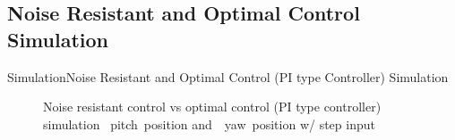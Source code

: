 \documentclass{beamer}
\begin{document}
\subsection{Noise Resistant and Optimal Control Simulation}
\begin{frame}{Simulation}{Noise Resistant and Optimal Control (PI type Controller) Simulation}
    \begin{figure}
      \centering
      \caption{Noise resistant control vs optimal control (PI type controller) simulation ~pitch~position and~~yaw~position w/ step input}
      \label{fig:LQR_LQG_Sim_pos}
    \end{figure}
\end{frame}
\end{document}
